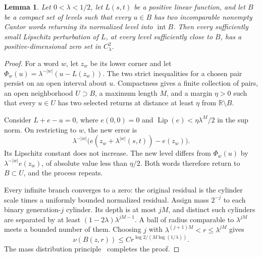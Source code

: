\documentclass[11pt,a4paper]{amsart}
\numberwithin{equation}{section}
\newtheorem{lemma}[theorem]{Lemma}
\theoremstyle{definition}
\begin{document}
\begin{lemma}\label{lem:strict-returns}
Let \(0<\lambda<1/2\), let \(L(s,t)\) be a positive linear function,
and let \(B\) be a compact
set of levels such that every \(u\in B\) has two incomparable
nonempty Cantor words returning its normalized level into
\(\operatorname{int}B\).
Then every sufficiently small Lipschitz perturbation of \(L\),
at every level sufficiently close to \(B\), has a positive-dimensional
zero set in \(C_\lambda^2\).
\end{lemma}
\begin{proof}
For a word \(w\), let \(z_w\) be its lower corner and let
\(\Phi_w(u)=\lambda^{-|w|}(u-L(z_w))\).
The two strict inequalities for a chosen pair persist on an
open interval about \(u\). Compactness gives a finite collection
of pairs, an open neighborhood \(U\supset B\), a maximum length
\(M\), and a margin \(\eta>0\) such that every \(u\in U\) has
two selected returns at distance at least \(\eta\) from
\(\mathbb R\setminus B\).

Consider \(L+e-u=0\), where \(e(0,0)=0\) and
\(\operatorname{Lip}(e)<\eta\lambda^M/2\) in the sup norm.
On restricting to \(w\), the new error is
\[
\lambda^{-|w|}
\bigl(e(z_w+\lambda^{|w|}(s,t))-e(z_w)\bigr).
\]
Its Lipschitz constant does not increase. The new level differs
from \(\Phi_w(u)\) by \(\lambda^{-|w|}e(z_w)\), of absolute
value less than \(\eta/2\). Both words therefore return to
\(B\subset U\), and the process repeats.

Every infinite branch converges to a zero: the original residual
is the cylinder scale times a uniformly bounded normalized
residual. Assign mass \(2^{-j}\) to each binary generation-\(j\)
cylinder. Its depth is at most \(jM\), and distinct such cylinders
are separated by at least
\((1-2\lambda)\lambda^{jM-1}\).
A ball of radius comparable to \(\lambda^{jM}\) meets a bounded
number of them. Choosing \(j\) with
\(\lambda^{(j+1)M}<r\leq\lambda^{jM}\) gives
\[
\nu(B(z,r))\leq C r^{\log2/(M\log(1/\lambda))}.
\]
The mass distribution principle~\cite{Mattila1995} completes the proof.
\end{proof}
\end{document}
